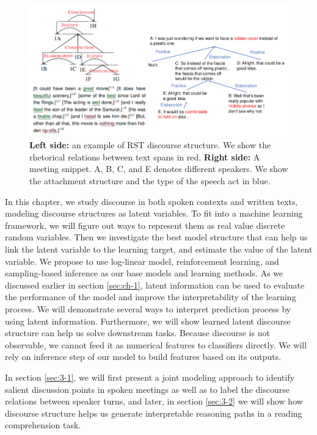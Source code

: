 \begin{figure}[t] 
\centering
\includegraphics[width=1.0\columnwidth]{Images/dis_intro.png} 
  \caption{\textbf{Left side:} an example of RST discourse structure. We show the rhetorical relations between text spans in red. \textbf{Right side:} A meeting snippet. A, B, C, and E denotes different speakers. We show the attachment structure and the type of the speech act in blue.}
\end{figure}\label{fig:dis_intro} 

In this chapter, we study discourse in both spoken contexts and written texts, modeling discourse structures as latent variables. To fit into a machine learning framework, we will figure out ways to represent them as real value discrete random variables. Then we investigate the best model structure that can help us link the latent variable to the learning target, and estimate the value of the latent variable. We propose to use log-linear model, reinforcement learning, and sampling-based inference as our base models and learning methods. As we discussed earlier in section \ref{sec:ch-1}, latent information can be used to evaluate the performance of the model and improve the interpretability of the learning process. We will demonstrate several ways to interpret prediction process by using latent information. Furthermore, we will show learned latent discourse structure can help us solve downstream tasks. Because discourse is not observable, we cannot feed it as numerical features to classifiers directly. We will rely on inference step of our model to build features based on its outputs.

In section \ref{sec:3-1}, we will first present a joint modeling approach to identify salient discussion points in spoken meetings as well as to label the discourse relations between speaker turns, and later, in section \ref{sec:3-2} we will show how discourse structure helps us generate interpretable reasoning paths in a reading comprehension task.
